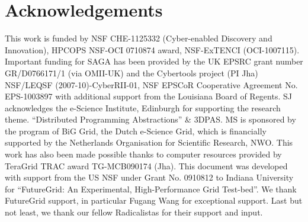 \documentclass[times]{cpeauth}
\begin{document}
\section*{Acknowledgements}
\footnotesize{This work is funded by NSF CHE-1125332 (Cyber-enabled
  Discovery and Innovation), HPCOPS NSF-OCI 0710874 award, NSF-ExTENCI
  (OCI-1007115).  Important funding for SAGA has been provided by the
  UK EPSRC grant number GR/D0766171/1 (via OMII-UK) and the Cybertools
  project (PI Jha) NSF/LEQSF (2007-10)-CyberRII-01, NSF EPSCoR
  Cooperative Agreement No. EPS-1003897 with additional support from
  the Louisiana Board of Regents.  SJ acknowledges the e-Science
  Institute, Edinburgh for supporting the research
  theme. ``Distributed Programming Abstractions'' \& 3DPAS. MS is
  sponsored by the program of BiG Grid, the Dutch e-Science Grid,
  which is financially supported by the Netherlands Organisation for
  Scientific Research, NWO. This work has also been made possible
  thanks to computer resources provided by TeraGrid TRAC award
  TG-MCB090174 (Jha). This document was developed with support from
  the US NSF under Grant No. 0910812 to Indiana University for
  ``FutureGrid: An Experimental, High-Performance Grid Test-bed''. We
  thank FutureGrid support, in particular Fugang Wang for exceptional
  support. Last but not least, we thank our fellow Radicalistas for
  their support and input.}



\end{document}
